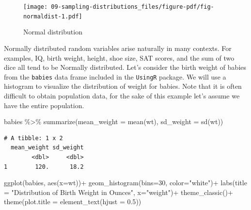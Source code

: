 \documentclass[
  letterpaper,
  DIV=11,
  numbers=noendperiod]{scrreprt}
\newenvironment{Shaded}{\begin{snugshade}}{\end{snugshade}}
\newcommand{\AttributeTok}[1]{\textcolor[rgb]{0.40,0.45,0.13}{#1}}
\newcommand{\DecValTok}[1]{\textcolor[rgb]{0.68,0.00,0.00}{#1}}
\newcommand{\FloatTok}[1]{\textcolor[rgb]{0.68,0.00,0.00}{#1}}
\newcommand{\FunctionTok}[1]{\textcolor[rgb]{0.28,0.35,0.67}{#1}}
\newcommand{\NormalTok}[1]{\textcolor[rgb]{0.00,0.23,0.31}{#1}}
\newcommand{\SpecialCharTok}[1]{\textcolor[rgb]{0.37,0.37,0.37}{#1}}
\newcommand{\StringTok}[1]{\textcolor[rgb]{0.13,0.47,0.30}{#1}}
\theoremstyle{definition}
\theoremstyle{remark}
\begin{document}
\begin{figure}

{\centering \texttt{[image: 09-sampling-distributions\_files/figure-pdf/fig-normaldist-1.pdf]}

}

\caption{\label{fig-normaldist}Normal distribution}

\end{figure}

Normally distributed random variables arise naturally in many contexts.
For examples, IQ, birth weight, height, shoe size, SAT scores, and the
sum of two dice all tend to be Normally distributed. Let's consider the
birth weight of babies from the \texttt{babies} data frame included in
the \texttt{UsingR} package. We will use a histogram to visualize the
distribution of weight for babies. Note that it is often difficult to
obtain population data, for the sake of this example let's assume we
have the entire population.

\begin{Shaded}
\begin{Highlighting}[]
\NormalTok{babies }\SpecialCharTok{\%\textgreater{}\%}
  \FunctionTok{summarize}\NormalTok{(}\AttributeTok{mean\_weight =} \FunctionTok{mean}\NormalTok{(wt),}
            \AttributeTok{sd\_weight =} \FunctionTok{sd}\NormalTok{(wt))}
\end{Highlighting}
\end{Shaded}

\begin{verbatim}
# A tibble: 1 x 2
  mean_weight sd_weight
        <dbl>     <dbl>
1        120.      18.2
\end{verbatim}

\begin{Shaded}
\begin{Highlighting}[]
\FunctionTok{ggplot}\NormalTok{(babies, }\FunctionTok{aes}\NormalTok{(}\AttributeTok{x=}\NormalTok{wt))}\SpecialCharTok{+}
  \FunctionTok{geom\_histogram}\NormalTok{(}\AttributeTok{bins=}\DecValTok{30}\NormalTok{, }\AttributeTok{color=}\StringTok{"white"}\NormalTok{)}\SpecialCharTok{+}
  \FunctionTok{labs}\NormalTok{(}\AttributeTok{title =} \StringTok{"Distribution of Birth Weight in Ounces"}\NormalTok{, }\AttributeTok{x=}\StringTok{"weight"}\NormalTok{)}\SpecialCharTok{+}
  \FunctionTok{theme\_classic}\NormalTok{()}\SpecialCharTok{+}
  \FunctionTok{theme}\NormalTok{(}\AttributeTok{plot.title =} \FunctionTok{element\_text}\NormalTok{(}\AttributeTok{hjust =} \FloatTok{0.5}\NormalTok{))}
\end{Highlighting}
\end{Shaded}
\end{document}
